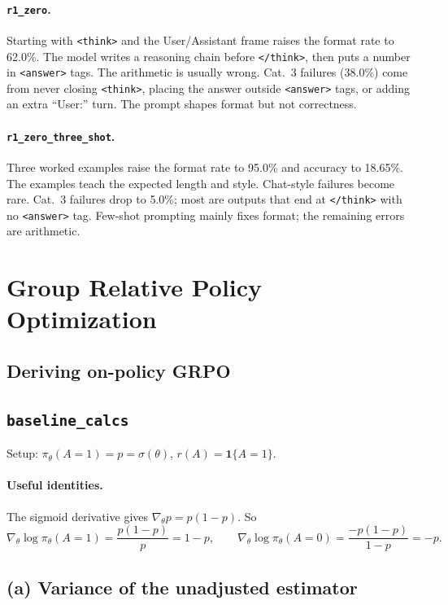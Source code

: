 \documentclass[11pt]{article}
\newcommand{\policy}{\pi_\theta}
\newcommand{\problemid}[1]{\subsection*{\nolinkurl{#1}}}
\begin{document}
\paragraph{\texttt{r1\_zero}.}
Starting with \texttt{<think>} and the User/Assistant frame raises the format
rate to 62.0\%. The model writes a reasoning chain before \texttt{</think>},
then puts a number in \texttt{<answer>} tags. The arithmetic is usually wrong.
Cat.~3 failures (38.0\%) come from never closing \texttt{<think>}, placing the
answer outside \texttt{<answer>} tags, or adding an extra ``User:'' turn.
The prompt shapes format but not correctness.

\paragraph{\texttt{r1\_zero\_three\_shot}.}
Three worked examples raise the format rate to 95.0\% and accuracy to 18.65\%.
The examples teach the expected length and style. Chat-style failures become
rare. Cat.~3 failures drop to 5.0\%; most are outputs that end at
\texttt{</think>} with no \texttt{<answer>} tag. Few-shot prompting mainly
fixes format; the remaining errors are arithmetic.

\section{Group Relative Policy Optimization}

\subsection{Deriving on-policy GRPO}

\problemid{baseline_calcs}

Setup: $\policy(A=1) = p = \sigma(\theta)$, $r(A) = \mathbf{1}\{A=1\}$.

\paragraph{Useful identities.} The sigmoid derivative gives $\nabla_\theta p = p(1-p)$. So
\[
\nabla_\theta \log \policy(A=1) = \frac{p(1-p)}{p} = 1-p,
\qquad
\nabla_\theta \log \policy(A=0) = \frac{-p(1-p)}{1-p} = -p.
\]

\subsection*{(a) Variance of the unadjusted estimator}
\end{document}
